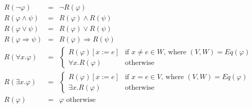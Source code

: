 \begin{equation*}
\begin{array}{lll}
R\left( \lnot \varphi \right) & = & \lnot R\left( \varphi \right) \\ 
R\left( \varphi \wedge \psi \right) & = & R\left( \varphi \right) \wedge
R\left( \psi \right) \\ 
R\left( \varphi \vee \psi \right) & = & R\left( \varphi \right) \vee R\left(
\psi \right) \\ 
R\left( \varphi \Rightarrow \psi \right) & = & R\left( \varphi \right)
\Rightarrow R\left( \psi \right) \\ 
R\left( \forall x.\varphi \right) & = & \left\{ 
\begin{array}{cc}
R\left( \varphi \right) \left[ x:=e\right] & \text{if }x\neq e\in W\text{,
where }\left( V,W\right) =Eq\left( \varphi \right) \\ 
\forall x.R\left( \varphi \right) & \text{otherwise}%
\end{array}%
\right. \\ 
R\left( \exists x.\varphi \right) & = & \left\{ 
\begin{array}{cc}
R\left( \varphi \right) \left[ x:=e\right] & \text{if }x=e\in V\text{, where 
}\left( V,W\right) =Eq\left( \varphi \right) \\ 
\exists x.R\left( \varphi \right) & \text{otherwise}%
\end{array}%
\right. \\ 
R\left( \varphi \right) & = & \varphi \text{ otherwise}%
\end{array}%
\end{equation*}

\newpage
